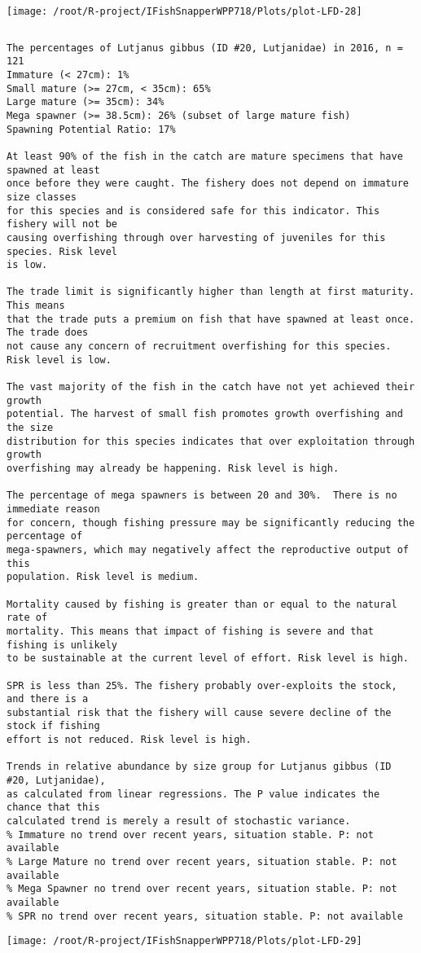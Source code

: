 \documentclass{report}\usepackage[]{graphicx}\usepackage[]{color}
\makeatletter
\def\maxwidth{ %
  \ifdim\Gin@nat@width>\linewidth
    \linewidth
  \else
    \Gin@nat@width
  \fi
}
\newenvironment{kframe}{%
 \def\at@end@of@kframe{}%
 \ifinner\ifhmode%
  \def\at@end@of@kframe{\end{minipage}}%
  \begin{minipage}{\columnwidth}%
 \fi\fi%
 \def\FrameCommand##1{\hskip\@totalleftmargin \hskip-\fboxsep
 \colorbox{shadecolor}{##1}\hskip-\fboxsep
     \hskip-\linewidth \hskip-\@totalleftmargin \hskip\columnwidth}%
 \MakeFramed {\advance\hsize-\width
   \@totalleftmargin\z@ \linewidth\hsize
   \@setminipage}}%
 {\par\unskip\endMakeFramed%
 \at@end@of@kframe}
\newenvironment{knitrout}{}{} %
\makeatother
\begin{document}
\begin{knitrout}
\texttt{[image: /root/R-project/IFishSnapperWPP718/Plots/plot-LFD-28]} 
\begin{kframe}\begin{verbatim}
\end{verbatim}
\end{kframe}
\clearpage
\newpage
\begin{kframe}\begin{verbatim}The percentages of Lutjanus gibbus (ID #20, Lutjanidae) in 2016, n = 121
Immature (< 27cm): 1%
Small mature (>= 27cm, < 35cm): 65%
Large mature (>= 35cm): 34%
Mega spawner (>= 38.5cm): 26% (subset of large mature fish)
Spawning Potential Ratio: 17%
 
At least 90% of the fish in the catch are mature specimens that have spawned at least
once before they were caught. The fishery does not depend on immature size classes
for this species and is considered safe for this indicator. This fishery will not be
causing overfishing through over harvesting of juveniles for this species. Risk level
is low.

The trade limit is significantly higher than length at first maturity.  This means
that the trade puts a premium on fish that have spawned at least once. The trade does
not cause any concern of recruitment overfishing for this species. Risk level is low.

The vast majority of the fish in the catch have not yet achieved their growth
potential. The harvest of small fish promotes growth overfishing and the size
distribution for this species indicates that over exploitation through growth
overfishing may already be happening. Risk level is high.

The percentage of mega spawners is between 20 and 30%.  There is no immediate reason
for concern, though fishing pressure may be significantly reducing the percentage of
mega-spawners, which may negatively affect the reproductive output of this
population. Risk level is medium.
 
Mortality caused by fishing is greater than or equal to the natural rate of
mortality. This means that impact of fishing is severe and that fishing is unlikely
to be sustainable at the current level of effort. Risk level is high.
 
SPR is less than 25%. The fishery probably over-exploits the stock, and there is a
substantial risk that the fishery will cause severe decline of the stock if fishing
effort is not reduced. Risk level is high.
 
Trends in relative abundance by size group for Lutjanus gibbus (ID #20, Lutjanidae),
as calculated from linear regressions. The P value indicates the chance that this
calculated trend is merely a result of stochastic variance.
% Immature no trend over recent years, situation stable. P: not available
% Large Mature no trend over recent years, situation stable. P: not available
% Mega Spawner no trend over recent years, situation stable. P: not available
% SPR no trend over recent years, situation stable. P: not available
\end{verbatim}
\end{kframe}
\texttt{[image: /root/R-project/IFishSnapperWPP718/Plots/plot-LFD-29]} 


\end{knitrout}
\end{document}
